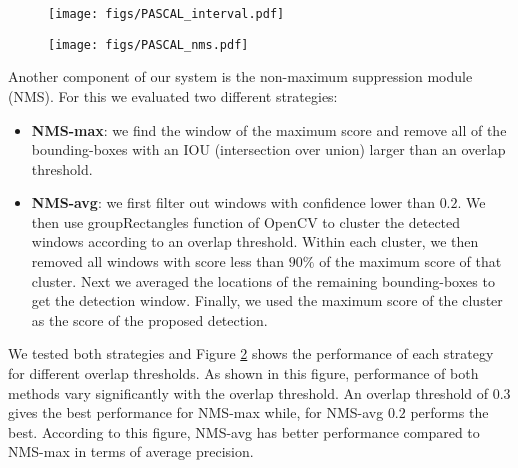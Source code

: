 \documentclass{sig-alternate-2013}
\begin{document}
\begin{figure}[t]
  \centering
    \texttt{[image: figs/PASCAL\_interval.pdf]}
  \caption{}
  \label{fig:f_s_effect}
\end{figure}

\begin{figure}[t]
  \centering
    \texttt{[image: figs/PASCAL\_nms.pdf]}
  \caption{}
  \label{fig:f_nms_effect}
\end{figure}

Another component of our system is the non-maximum suppression module (NMS). For this we evaluated two different strategies: 
\begin{itemize}
\item{\textbf{NMS-max}: we find the window of the maximum score and remove all of the bounding-boxes with an IOU (intersection over union) larger than an overlap threshold.} 
\item{\textbf{NMS-avg}: we first filter out windows with confidence lower than $0.2$. We then use groupRectangles function of OpenCV to cluster the detected windows according to an overlap threshold. Within each cluster, we then removed all windows with score less than $90\%$ of the maximum score of that cluster. Next we averaged the locations of the remaining bounding-boxes to get the detection window. Finally, we used the maximum score of the cluster as the score of the proposed detection.} 
\end{itemize}
We tested both strategies and Figure \ref{fig:f_nms_effect} shows the performance of each strategy for different overlap thresholds. As shown in this figure, performance of both methods vary significantly with the overlap threshold. An overlap threshold of $0.3$ gives the best performance for NMS-max while, for NMS-avg $0.2$ performs the best. According to this figure, NMS-avg has better performance compared to NMS-max in terms of average precision. 
\end{document}
